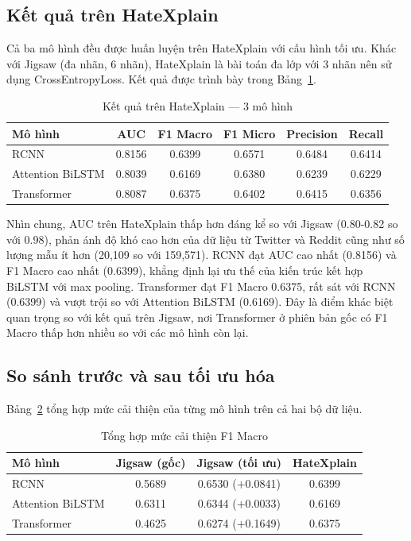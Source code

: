 \documentclass[../BTL.tex]{subfiles}
\begin{document}
\subsection{Kết quả trên HateXplain}
Cả ba mô hình đều được huấn luyện trên HateXplain với cấu hình tối ưu. Khác với Jigsaw (đa nhãn, 6 nhãn), HateXplain là bài toán đa lớp với 3 nhãn nên sử dụng CrossEntropyLoss. Kết quả được trình bày trong Bảng~\ref{tab:hatexplain_results}.

\begin{table}[H]
\centering
\small
\begin{tabular}{|l|c|c|c|c|c|}
\hline
\textbf{Mô hình} & \textbf{AUC} & \textbf{F1 Macro} & \textbf{F1 Micro} & \textbf{Precision} & \textbf{Recall} \\ \hline
RCNN & 0.8156 & 0.6399 & 0.6571 & 0.6484 & 0.6414 \\ \hline
Attention BiLSTM & 0.8039 & 0.6169 & 0.6380 & 0.6239 & 0.6229 \\ \hline
Transformer & 0.8087 & 0.6375 & 0.6402 & 0.6415 & 0.6356 \\ \hline
\end{tabular}
\caption{Kết quả trên HateXplain — 3 mô hình}
\label{tab:hatexplain_results}
\end{table}

Nhìn chung, AUC trên HateXplain thấp hơn đáng kể so với Jigsaw (0.80-0.82 so với 0.98), phản ánh độ khó cao hơn của dữ liệu từ Twitter và Reddit cũng như số lượng mẫu ít hơn (20,109 so với 159,571). RCNN đạt AUC cao nhất (0.8156) và F1 Macro cao nhất (0.6399), khẳng định lại ưu thế của kiến trúc kết hợp BiLSTM với max pooling. Transformer đạt F1 Macro 0.6375, rất sát với RCNN (0.6399) và vượt trội so với Attention BiLSTM (0.6169). Đây là điểm khác biệt quan trọng so với kết quả trên Jigsaw, nơi Transformer ở phiên bản gốc có F1 Macro thấp hơn nhiều so với các mô hình còn lại.

\subsection{So sánh trước và sau tối ưu hóa}
Bảng~\ref{tab:comparison_summary} tổng hợp mức cải thiện của từng mô hình trên cả hai bộ dữ liệu.

\begin{table}[H]
\centering
\small
\begin{tabular}{|l|c|c|c|}
\hline
\textbf{Mô hình} & \textbf{Jigsaw (gốc)} & \textbf{Jigsaw (tối ưu)} & \textbf{HateXplain} \\ \hline
RCNN & 0.5689 & 0.6530 ($+$0.0841) & 0.6399 \\ \hline
Attention BiLSTM & 0.6311 & 0.6344 ($+$0.0033) & 0.6169 \\ \hline
Transformer & 0.4625 & 0.6274 ($+$0.1649) & 0.6375 \\ \hline
\end{tabular}
\caption{Tổng hợp mức cải thiện F1 Macro}
\label{tab:comparison_summary}
\end{table}
\end{document}
